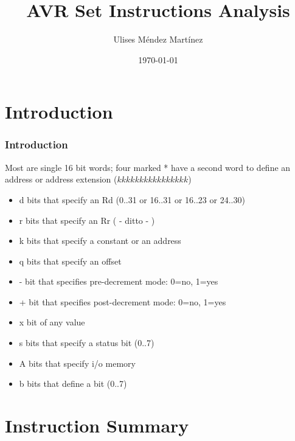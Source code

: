 \documentclass{beamer}
\title[AVR Set Instructions Analysis]{AVR Set Instructions Analysis} %
\author{Ulises M\'endez Mart\'{i}nez} %
\institute[UAG] %
{
Universidad Aut\'onoma de Guadalajara  \\ %
\medskip
\textit{ulisesmdzmtz@gmail.com} %
}
\date{\today} %
\begin{document}
\begin{frame}
\titlepage %
\end{frame}



\section{Introduction} 
\begin{frame}
\frametitle{Introduction}
Most are single 16 bit words; four marked * have a second word
to define an address or address extension ($kkkk kkkk kkkk kkkk$)
\\
\begin{itemize}
\item  d  bits that specify an Rd (0..31 or 16..31 or 16..23 or 24..30)\\
\item  r  bits that specify an Rr ( - ditto - )\\
\item  k  bits that specify a constant or an address\\
\item  q  bits that specify an offset\\
\item  -  bit that specifies pre-decrement mode: 0=no, 1=yes\\
\item  +  bit that specifies post-decrement mode: 0=no, 1=yes\\
\item  x  bit of any value\\
\item  s  bits that specify a status bit (0..7)\\
\item  A  bits that specify i/o memory\\
\item  b  bits that define a bit (0..7)\\
\end{itemize}
\end{frame}
\section{Instruction Summary} 
\end{document}
